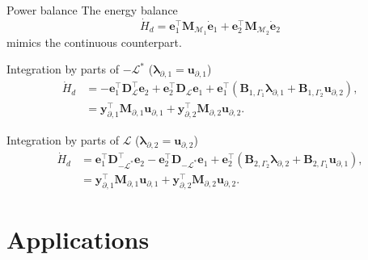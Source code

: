 \documentclass[aspectratio=169]{ISAE-Beamer}
\begin{document}
\begin{frame}{Power balance}
	The energy balance
	\begin{equation*}
		\dot{H}_d = \mathbf{e}_1^\top \mathbf{M}_{\mathcal{M}_1} \dot{\mathbf{e}}_1 + \mathbf{e}_2^\top \mathbf{M}_{\mathcal{M}_2} \dot{\mathbf{e}}_2
	\end{equation*}
	mimics the continuous counterpart.
	\begin{exampleblock}{Integration by parts of $-\mathcal{L}^*$ ($\bm{\lambda}_{\partial, 1} = \bm{u}_{\partial, 1}$)}
		\begin{equation*}
			\begin{aligned}
				\dot{H}_d &= -\mathbf{e}_1^\top \mathbf{D}_\mathcal{L}^\top {\mathbf{e}}_2 + \mathbf{e}_2^\top\mathbf{D}_\mathcal{L} {\mathbf{e}}_1 + \mathbf{e}_1^\top (\mathbf{B}_{1, \Gamma_1} \bm{\lambda}_{\partial, 1} + \mathbf{B}_{1, \Gamma_2} \mathbf{u}_{\partial, 2} ), \\
				&= \mathbf{y}_{\partial, 1}^\top \mathbf{M}_{\partial, 1} \mathbf{u}_{\partial, 1} + \mathbf{y}_{\partial, 2}^\top \mathbf{M}_{\partial, 2} \mathbf{u}_{\partial, 2}. 
			\end{aligned}
		\end{equation*}
	\end{exampleblock}
	\begin{exampleblock}{Integration by parts of $\mathcal{L}$ ($\bm{\lambda}_{\partial, 2} = \bm{u}_{\partial, 2}$)}
		\begin{equation*}
			\begin{aligned}
				\dot{H}_d &= \mathbf{e}_1^\top \mathbf{D}_{-\mathcal{L}^*}^\top {\mathbf{e}}_2 - \mathbf{e}_2^\top\mathbf{D}_{-\mathcal{L}^*} {\mathbf{e}}_1 + \mathbf{e}_2^\top (\mathbf{B}_{2, \Gamma_2} \bm{\lambda}_{\partial, 2} + \mathbf{B}_{2, \Gamma_1} \mathbf{u}_{\partial, 1} ), \\
				&= \mathbf{y}_{\partial, 1}^\top \mathbf{M}_{\partial, 1} \mathbf{u}_{\partial, 1} + \mathbf{y}_{\partial, 2}^\top \mathbf{M}_{\partial, 2} \mathbf{u}_{\partial, 2}. 
			\end{aligned}
		\end{equation*}
	\end{exampleblock}
\end{frame}



\section{Applications}
\end{document}
